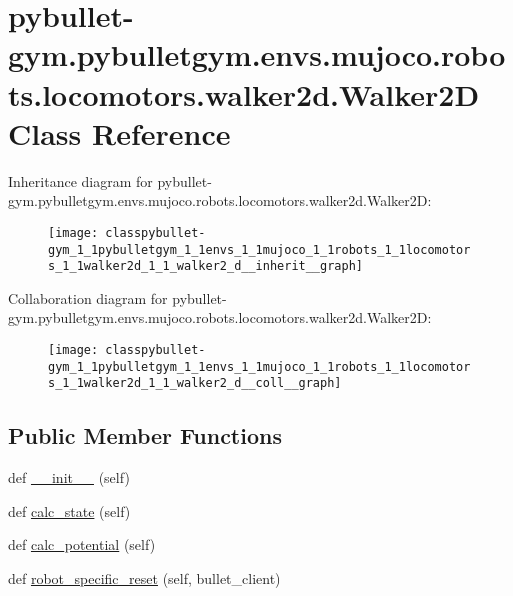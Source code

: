 \hypertarget{classpybullet-gym_1_1pybulletgym_1_1envs_1_1mujoco_1_1robots_1_1locomotors_1_1walker2d_1_1_walker2_d}{}\section{pybullet-\/gym.pybulletgym.\+envs.\+mujoco.\+robots.\+locomotors.\+walker2d.\+Walker2D Class Reference}
\label{classpybullet-gym_1_1pybulletgym_1_1envs_1_1mujoco_1_1robots_1_1locomotors_1_1walker2d_1_1_walker2_d}


Inheritance diagram for pybullet-\/gym.pybulletgym.\+envs.\+mujoco.\+robots.\+locomotors.\+walker2d.\+Walker2D\+:
\nopagebreak
\begin{figure}[H]
\begin{center}
\leavevmode
\texttt{[image: classpybullet-gym\_1\_1pybulletgym\_1\_1envs\_1\_1mujoco\_1\_1robots\_1\_1locomotors\_1\_1walker2d\_1\_1\_walker2\_d\_\_inherit\_\_graph]}
\end{center}
\end{figure}


Collaboration diagram for pybullet-\/gym.pybulletgym.\+envs.\+mujoco.\+robots.\+locomotors.\+walker2d.\+Walker2D\+:
\nopagebreak
\begin{figure}[H]
\begin{center}
\leavevmode
\texttt{[image: classpybullet-gym\_1\_1pybulletgym\_1\_1envs\_1\_1mujoco\_1\_1robots\_1\_1locomotors\_1\_1walker2d\_1\_1\_walker2\_d\_\_coll\_\_graph]}
\end{center}
\end{figure}
\subsection*{Public Member Functions}
\begin{DoxyCompactItemize}
\item 
def \hyperlink{classpybullet-gym_1_1pybulletgym_1_1envs_1_1mujoco_1_1robots_1_1locomotors_1_1walker2d_1_1_walker2_d_a4123f538ead799d84dd534b4e0fffe73}{\+\_\+\+\_\+init\+\_\+\+\_\+} (self)
\item 
def \hyperlink{classpybullet-gym_1_1pybulletgym_1_1envs_1_1mujoco_1_1robots_1_1locomotors_1_1walker2d_1_1_walker2_d_af1b5292cfe589fdff14dd20ea37dad0c}{calc\+\_\+state} (self)
\item 
def \hyperlink{classpybullet-gym_1_1pybulletgym_1_1envs_1_1mujoco_1_1robots_1_1locomotors_1_1walker2d_1_1_walker2_d_a8c3261b0c95d818325acbbcef3b185ef}{calc\+\_\+potential} (self)
\item 
def \hyperlink{classpybullet-gym_1_1pybulletgym_1_1envs_1_1mujoco_1_1robots_1_1locomotors_1_1walker2d_1_1_walker2_d_af3979b5e6ab4c0c74c3d15255fccc71a}{robot\+\_\+specific\+\_\+reset} (self, bullet\+\_\+client)
\end{DoxyCompactItemize}
